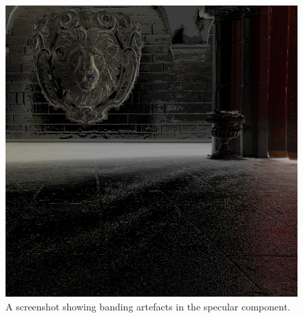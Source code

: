 \documentclass[]{acmsiggraph}
\begin{document}
\begin{figure}[htbp]\centering
\includegraphics[width=1.0\linewidth]{images/banding.png}
\caption{\label{figure:banding}A screenshot showing banding artefacts in the specular component.}{}
\end{figure}



\end{document}
